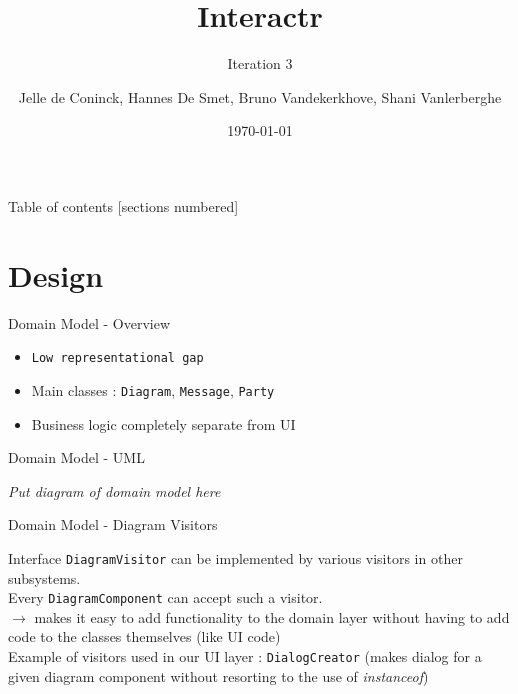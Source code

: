 \documentclass[10pt]{beamer}
\title{Interactr}
\subtitle{Iteration 3}
\date{\today}
\author{Jelle de Coninck, Hannes De Smet, Bruno Vandekerkhove, Shani Vanlerberghe}
\institute{KULeuven}
\begin{document}
\maketitle

\begin{frame}{Table of contents}
  [sections numbered]
  \tableofcontents[hideallsubsections]
\end{frame}

\section{Design}

\begin{frame}[fragile]{Domain Model - Overview}
	\begin{center}
	\begin{itemize}
	\item \texttt{Low representational gap}
	\item Main classes : \texttt{Diagram}, \texttt{Message}, \texttt{Party}
	\item Business logic completely separate from UI
	\end{itemize}
	\end{center}
\end{frame}

\begin{frame}[fragile]{Domain Model - UML}
	\begin{center}
	\textit{Put diagram of domain model here}
	\end{center}
\end{frame}

\begin{frame}[fragile]{Domain Model - Diagram Visitors}
	\begin{center}
	Interface \texttt{DiagramVisitor} can be implemented by various visitors in other subsystems.\\
	Every \texttt{DiagramComponent} can accept such a visitor.\\
	\vspace{0.5cm}
	$\rightarrow$ makes it easy to add functionality to the domain layer without having to add code to the classes themselves (like UI code)\\
	\vspace{0.5cm}
	\small Example of visitors used in our UI layer : \texttt{DialogCreator} (makes dialog for a given diagram component without resorting to the use of \textit{instanceof})
	\end{center}
\end{frame}
\end{document}
